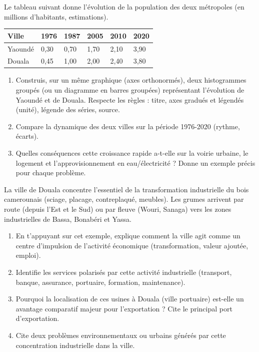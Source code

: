\documentclass[11pt]{article}
\newcommand{\cle}[1]{{\popxbold\color{popdark}#1}}
\begin{document}
\begin{exercice}
Le tableau suivant donne l'évolution de la population des deux métropoles (en millions d'habitants, estimations).

\begin{center}
\begin{tabularx}{\linewidth}{|l|X|X|X|X|X|}\hline
\textbf{Ville} & \textbf{1976} & \textbf{1987} & \textbf{2005} & \textbf{2010} & \textbf{2020} \\ \hline
Yaoundé & 0,30 & 0,70 & 1,70 & 2,10 & 3,90 \\ \hline
Douala & 0,45 & 1,00 & 2,00 & 2,40 & 3,80 \\ \hline
\end{tabularx}
\end{center}

\begin{enumerate}
    \item Construis, sur un même graphique (axes orthonormés), deux histogrammes groupés (ou un diagramme en barres groupées) représentant l'évolution de Yaoundé et de Douala. Respecte les règles : titre, axes gradués et légendés (unité), légende des séries, source.
    \item Compare la dynamique des deux villes sur la période 1976-2020 (rythme, écarts).
    \item Quelles conséquences cette croissance rapide a-t-elle sur la \cle{voirie urbaine}, le \cle{logement} et l'\cle{approvisionnement en eau/électricité} ? Donne un exemple précis pour chaque problème.
\end{enumerate}
\end{exercice}

\begin{exercice}
La ville de Douala concentre l'essentiel de la transformation industrielle du bois camerounais (sciage, placage, contreplaqué, meubles). Les grumes arrivent par route (depuis l'Est et le Sud) ou par fleuve (Wouri, Sanaga) vers les zones industrielles de Bassa, Bonabéri et Yassa.

\begin{enumerate}
    \item En t'appuyant sur cet exemple, explique comment la ville agit comme un \cle{centre d'impulsion de l'activité économique} (transformation, valeur ajoutée, emploi).
    \item Identifie les \cle{services polarisés} par cette activité industrielle (transport, banque, assurance, portuaire, formation, maintenance).
    \item Pourquoi la localisation de ces usines à Douala (ville portuaire) est-elle un avantage comparatif majeur pour l'exportation ? Cite le principal port d'exportation.
    \item Cite deux problèmes environnementaux ou urbains générés par cette concentration industrielle dans la ville.
\end{enumerate}
\end{exercice}
\end{document}
